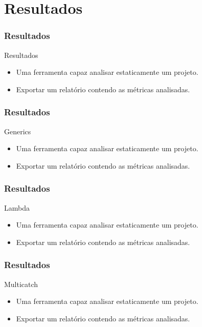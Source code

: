 \documentclass[]{beamer}
\begin{document}
		
	

	\section{Resultados}
	\begin{frame}[fragile, label=re]\frametitle{Resultados}
		\begin{block}{Resultados}
			\begin{itemize}
				\item Uma ferramenta capaz analisar estaticamente um projeto.
				
				\item Exportar um relatório contendo as métricas analisadas.
				
			\end{itemize}
		\end{block}
	\end{frame}
	
	\begin{frame}[fragile, label=re]\frametitle{Resultados}
		\begin{block}{Generics}
			\begin{itemize}
				\item Uma ferramenta capaz analisar estaticamente um projeto.
				
				\item Exportar um relatório contendo as métricas analisadas.
				
			\end{itemize}
		\end{block}
	\end{frame}


	\begin{frame}[fragile, label=re]\frametitle{Resultados}
		\begin{block}{Lambda}
			\begin{itemize}
				\item Uma ferramenta capaz analisar estaticamente um projeto.
				
				\item Exportar um relatório contendo as métricas analisadas.
				
			\end{itemize}
		\end{block}
	\end{frame}	
	
	\begin{frame}[fragile, label=re]\frametitle{Resultados}
		\begin{block}{Multicatch}
			\begin{itemize}
				\item Uma ferramenta capaz analisar estaticamente um projeto.
				
				\item Exportar um relatório contendo as métricas analisadas.
				
			\end{itemize}
		\end{block}
	\end{frame}	
	
\end{document}
